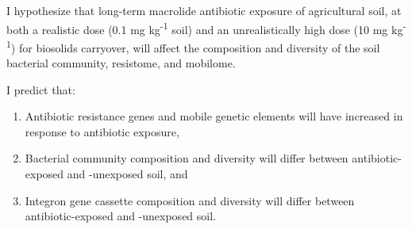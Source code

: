 I hypothesize that long-term macrolide antibiotic exposure of agricultural soil, at both a realistic dose (0.1 mg kg\textsuperscript{-1} soil) and an unrealistically high dose (10 mg kg\textsuperscript{-1}) for biosolids carryover, will affect the composition and diversity of the soil bacterial community, resistome, and mobilome.

I predict that:

\begin{enumerate}
  \item{Antibiotic resistance genes and mobile genetic elements will have increased in response to antibiotic exposure,}
  \item{Bacterial community composition and diversity will differ between antibiotic-exposed and -unexposed soil, and}
  \item{Integron gene cassette composition and diversity will differ between antibiotic-exposed and -unexposed soil.}
\end{enumerate}
